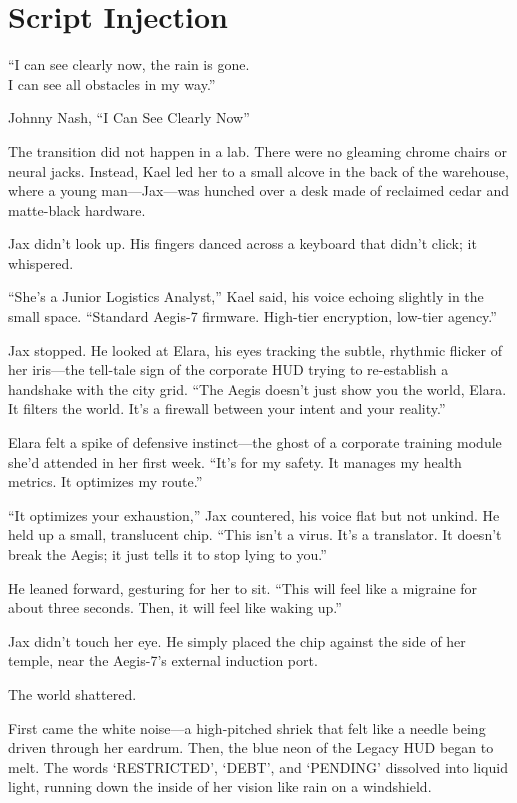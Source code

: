 
\chapter{Script Injection}
\epigraph{``I can see clearly now, the rain is gone.\\I can see all obstacles in my way.''}{Johnny Nash, “I Can See Clearly Now”}

The transition did not happen in a lab. There were no gleaming chrome chairs or neural jacks. Instead, Kael led her to a small alcove in the back of the warehouse, where a young man—Jax—was hunched over a desk made of reclaimed cedar and matte-black hardware. 

Jax didn't look up. His fingers danced across a keyboard that didn't click; it whispered. 

``She's a Junior Logistics Analyst,'' Kael said, his voice echoing slightly in the small space. ``Standard Aegis-7 firmware. High-tier encryption, low-tier agency.''

Jax stopped. He looked at Elara, his eyes tracking the subtle, rhythmic flicker of her iris—the tell-tale sign of the corporate HUD trying to re-establish a handshake with the city grid. ``The Aegis doesn't just show you the world, Elara. It filters the world. It’s a firewall between your intent and your reality.''

Elara felt a spike of defensive instinct—the ghost of a corporate training module she’d attended in her first week. ``It’s for my safety. It manages my health metrics. It optimizes my route.''

``It optimizes your exhaustion,'' Jax countered, his voice flat but not unkind. He held up a small, translucent chip. ``This isn't a virus. It’s a translator. It doesn't break the Aegis; it just tells it to stop lying to you.''

He leaned forward, gesturing for her to sit. ``This will feel like a migraine for about three seconds. Then, it will feel like waking up.''



Jax didn't touch her eye. He simply placed the chip against the side of her temple, near the Aegis-7’s external induction port. 

The world shattered.

First came the white noise—a high-pitched shriek that felt like a needle being driven through her eardrum. Then, the blue neon of the Legacy HUD began to melt. The words `RESTRICTED', `DEBT', and `PENDING' dissolved into liquid light, running down the inside of her vision like rain on a windshield. 

